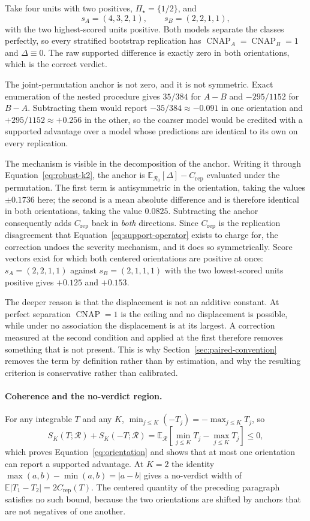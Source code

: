 \documentclass[11pt]{article}
\newcommand{\CNAP}{\operatorname{CNAP}}
\newcommand{\Regime}{\mathcal{R}}
\newcommand{\PSet}{\Pi_\star}
\newcommand{\E}{\mathbb{E}}
\theoremstyle{remark}
\begin{document}
Take four units with two positives, $\PSet=\{1/2\}$, and
\[
s_A=(4,3,2,1),
\qquad
s_B=(2,2,1,1),
\]
with the two highest-scored units positive. Both models separate the classes perfectly, so every stratified bootstrap replication has $\CNAP_A=\CNAP_B=1$ and $\Delta\equiv0$. The raw supported difference is exactly zero in both orientations, which is the correct verdict.

The joint-permutation anchor is not zero, and it is not symmetric. Exact enumeration of the nested procedure gives $35/384$ for $A-B$ and $-295/1152$ for $B-A$. Subtracting them would report $-35/384\approx-0.091$ in one orientation and $+295/1152\approx+0.256$ in the other, so the coarser model would be credited with a supported advantage over a model whose predictions are identical to its own on every replication.

The mechanism is visible in the decomposition of the anchor. Writing it through Equation~\eqref{eq:robust-k2}, the anchor is $\E_{\Regime_0}[\Delta]-C_{\mathrm{rep}}$ evaluated under the permutation. The first term is antisymmetric in the orientation, taking the values $\pm0.1736$ here; the second is a mean absolute difference and is therefore identical in both orientations, taking the value $0.0825$. Subtracting the anchor consequently adds $C_{\mathrm{rep}}$ back in \emph{both} directions. Since $C_{\mathrm{rep}}$ is the replication disagreement that Equation~\eqref{eq:support-operator} exists to charge for, the correction undoes the severity mechanism, and it does so symmetrically. Score vectors exist for which both centered orientations are positive at once: $s_A=(2,2,1,1)$ against $s_B=(2,1,1,1)$ with the two lowest-scored units positive gives $+0.125$ and $+0.153$.

The deeper reason is that the displacement is not an additive constant. At perfect separation $\CNAP=1$ is the ceiling and no displacement is possible, while under no association the displacement is at its largest. A correction measured at the second condition and applied at the first therefore removes something that is not present. This is why Section~\ref{sec:paired-convention} removes the term by definition rather than by estimation, and why the resulting criterion is conservative rather than calibrated.

\paragraph{Coherence and the no-verdict region.}
For any integrable $T$ and any $K$, $\min_{j\leq K}(-T_j)=-\max_{j\leq K}T_j$, so
\[
S_K(T;\Regime)+S_K(-T;\Regime)
=
\E_{\Regime}
\left[
\min_{j\leq K}T_j-\max_{j\leq K}T_j
\right]
\leq0,
\]
which proves Equation~\eqref{eq:orientation} and shows that at most one orientation can report a supported advantage. At $K=2$ the identity $\max(a,b)-\min(a,b)=|a-b|$ gives a no-verdict width of $\E|T_1-T_2|=2C_{\mathrm{rep}}(T)$. The centered quantity of the preceding paragraph satisfies no such bound, because the two orientations are shifted by anchors that are not negatives of one another.
\end{document}
